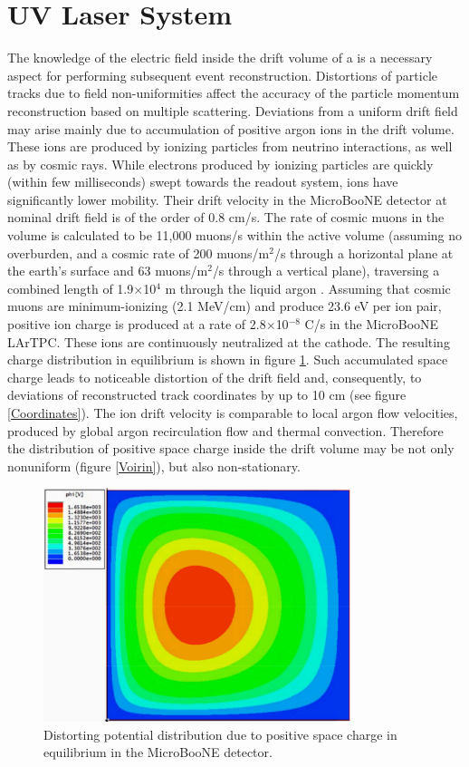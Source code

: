 \section{UV Laser System}
\label{sec:laser}

The knowledge of the electric field inside the drift volume of a \lartpc is a necessary aspect for performing subsequent event reconstruction. Distortions of particle tracks due to field non-uniformities affect the accuracy of the particle momentum reconstruction based on multiple scattering.  Deviations from a uniform drift field may arise mainly due to accumulation of positive argon ions in the drift volume. These ions are produced by ionizing particles from neutrino interactions, as well as by cosmic rays. While electrons produced by ionizing particles are quickly (within few milliseconds) swept towards the readout system, ions have significantly lower mobility. Their drift velocity in the MicroBooNE detector at nominal drift field is of the order of 0.8 cm/s. The rate of cosmic muons in the \lartpc volume is calculated to be 11,000 muons/s within the active volume (assuming no overburden, and a cosmic rate of 200 muons/m$^2$/s through a horizontal plane at the earth's surface and 63 muons/m$^2$/s through a vertical plane), traversing a combined length of 1.9$\times$10$^4$ m through the liquid argon \cite{mcdonald1,mcdonald2}.  Assuming that cosmic muons are minimum-ionizing (2.1 MeV/cm) and produce 23.6 eV per ion pair, positive ion charge is produced at a rate of 2.8$\times$10$^{-8}$ C/s in the MicroBooNE LArTPC. These ions are continuously neutralized at the cathode. The resulting charge distribution in equilibrium is shown in figure \ref{Ions}. Such accumulated space charge leads to noticeable distortion of the drift field and, consequently, to deviations of reconstructed track coordinates by up to 10 cm (see figure \ref{Coordinates}).  The ion drift velocity is comparable to local argon flow velocities, produced by global argon recirculation flow and thermal convection. Therefore the distribution of positive space charge inside the drift volume may be not only nonuniform (figure \ref{Voirin}), but also non-stationary.

\begin{figure}
\centering	
\includegraphics[width=0.8\textwidth]{figures/Potential.pdf}
\caption{Distorting potential distribution due to positive space charge in equilibrium in the MicroBooNE detector.}
\label{Ions}
\end{figure}

